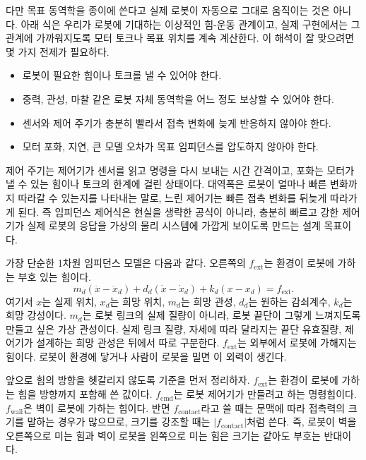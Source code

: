 다만 목표 동역학을 종이에 쓴다고 실제 로봇이 자동으로 그대로 움직이는 것은 아니다.
아래 식은 우리가 로봇에 기대하는 이상적인 힘-운동 관계이고, 실제 구현에서는 그 관계에 가까워지도록 모터 토크나 목표 위치를 계속 계산한다.
이 해석이 잘 맞으려면 몇 가지 전제가 필요하다.
\begin{itemize}
  \item 로봇이 필요한 힘이나 토크를 낼 수 있어야 한다.
  \item 중력, 관성, 마찰 같은 로봇 자체 동역학을 어느 정도 보상할 수 있어야 한다.
  \item 센서와 제어 주기가 충분히 빨라서 접촉 변화에 늦게 반응하지 않아야 한다.
  \item 모터 포화, 지연, 큰 모델 오차가 목표 임피던스를 압도하지 않아야 한다.
\end{itemize}
제어 주기는 제어기가 센서를 읽고 명령을 다시 보내는 시간 간격이고, 포화는 모터가 낼 수 있는 힘이나 토크의 한계에 걸린 상태이다.
대역폭은 로봇이 얼마나 빠른 변화까지 따라갈 수 있는지를 나타내는 말로, 느린 제어기는 빠른 접촉 변화를 뒤늦게 따라가게 된다.
즉 임피던스 제어식은 현실을 생략한 공식이 아니라, 충분히 빠르고 강한 제어기가 실제 로봇의 응답을 가상의 물리 시스템에 가깝게 보이도록 만드는 설계 목표이다.

가장 단순한 1차원 임피던스 모델은 다음과 같다.
오른쪽의 $f_{\mathrm{ext}}$는 환경이 로봇에 가하는 부호 있는 힘이다.
\begin{equation}
  m_d(\ddot{x}-\ddot{x}_d)
  +
  d_d(\dot{x}-\dot{x}_d)
  +
  k_d(x-x_d)
  =
  f_{\mathrm{ext}}.
  \label{eq:impedance_1d}
\end{equation}
여기서 $x$는 실제 위치, $x_d$는 희망 위치, $m_d$는 희망 관성, $d_d$는 원하는 감쇠계수, $k_d$는 희망 강성이다.
$m_d$는 로봇 링크의 실제 질량이 아니라, 로봇 끝단이 그렇게 느껴지도록 만들고 싶은 가상 관성이다.
실제 링크 질량, 자세에 따라 달라지는 끝단 유효질량, 제어기가 설계하는 희망 관성은 뒤에서 따로 구분한다.
$f_{\mathrm{ext}}$는 외부에서 로봇에 가해지는 힘이다.
로봇이 환경에 닿거나 사람이 로봇을 밀면 이 외력이 생긴다.

앞으로 힘의 방향을 헷갈리지 않도록 기준을 먼저 정리하자.
$f_{\mathrm{ext}}$는 환경이 로봇에 가하는 힘을 방향까지 포함해 쓴 값이다.
$f_{\mathrm{cmd}}$는 로봇 제어기가 만들려고 하는 명령힘이다.
$f_{\mathrm{wall}}$은 벽이 로봇에 가하는 힘이다.
반면 $f_{\mathrm{contact}}$라고 쓸 때는 문맥에 따라 접촉력의 크기를 말하는 경우가 많으므로, 크기를 강조할 때는 $|f_{\mathrm{contact}}|$처럼 쓴다.
즉, 로봇이 벽을 오른쪽으로 미는 힘과 벽이 로봇을 왼쪽으로 미는 힘은 크기는 같아도 부호는 반대이다.

